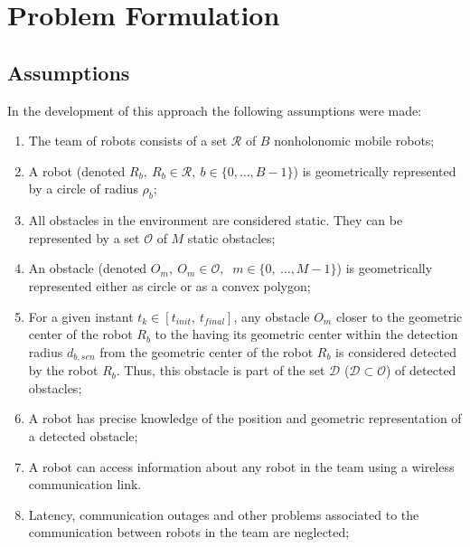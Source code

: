 \documentclass[eprint]{actapoly}
\begin{document}
\section{Problem Formulation}

\subsection{Assumptions}
In the development of this approach the following assumptions were made:

\begin{enumerate}

    \item The team of robots consists of a set $\mathcal{R}$ of $B$
    nonholonomic mobile robots;
    
    \item A robot (denoted $R_b,\ R_b \in \mathcal{R},\ b \in \{0,\dots,B-1\}$) is 
    geometrically represented by a circle of radius $\rho_b$;
        
    \item All obstacles in the environment are considered static. They can be
    represented by a set $\mathcal{O}$ of $M$ static obstacles;
    
    \item An obstacle (denoted $O_m,\ $\mbox{$O_m \in \mathcal{O}$}$,\ $
    \mbox{$m \in \{0,\ \dots, M-1\}$}) is geometrically represented either as
    circle or as a convex polygon;
    
    \item For a given instant $t_k \in [t_{init},\ t_{final}]$, any obstacle
    $O_m$ closer to the geometric center of the robot $R_b$ to the having its
    geometric center within the detection radius $d_{b,sen}$ from
    the geometric center of the robot $R_b$ is considered detected by the robot
    $R_b$. Thus, this obstacle is part of the set $\mathcal{D}$
    ($\mathcal{D} \subset \mathcal{O}$) of detected obstacles;
    
    \item A robot has precise knowledge of the position and geometric representation of
    a detected obstacle;
    
    \item A robot can access 
    information about any robot in the team using 
    a wireless communication link.
    
    \item Latency, communication outages and other problems associated
    to the communication between robots in the team are neglected;
        

\end{enumerate}
\end{document}
